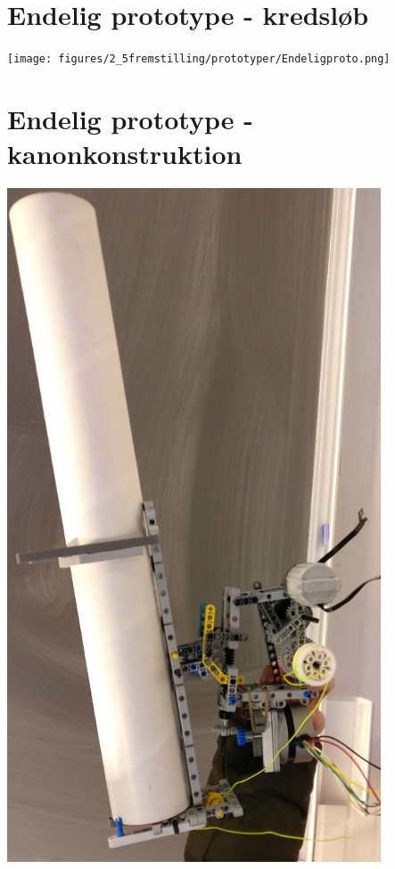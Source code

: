 






\section{Endelig prototype - kredsløb} \label{bilag:endeligprotokreds}
\begin{center}
	\texttt{[image: figures/2\_5fremstilling/prototyper/Endeligproto.png]}
\end{center}

\section{Endelig prototype - kanonkonstruktion} \label{bilag:endeligprotokanon}
\begin{center}
	\includegraphics[height=20cm]{figures/2_5fremstilling/prototyper/paenkanon.jpg}
\end{center}
